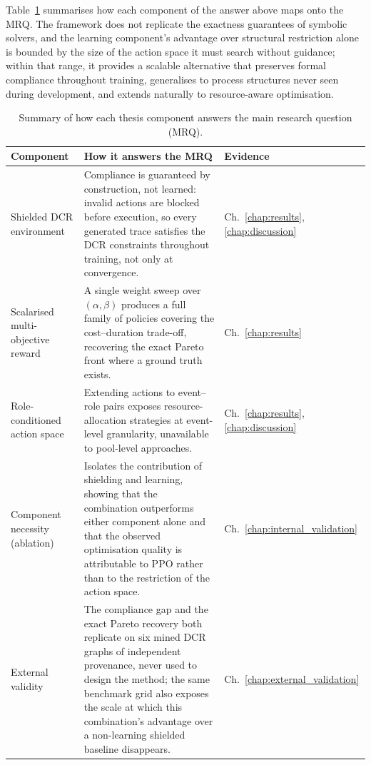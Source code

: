 Table~\ref{tab:mrq_answers} summarises how each component of the answer above maps onto the \ac{MRQ}. The framework does not replicate the exactness guarantees of symbolic solvers, and the learning component's advantage over structural restriction alone is bounded by the size of the action space it must search without guidance; within that range, it provides a scalable alternative that preserves formal compliance throughout training, generalises to process structures never seen during development, and extends naturally to resource-aware optimisation.


\begin{table}[H]
\centering
\caption{Summary of how each thesis component answers the main research question (MRQ).}
\label{tab:mrq_answers}
{\renewcommand{\arraystretch}{1.5}
\begin{tabularx}{\linewidth}{p{3.4cm} X p{2.6cm}}
\toprule
\textbf{Component} & \textbf{How it answers the MRQ} & \textbf{Evidence} \\
\midrule

Shielded \ac{DCR} environment &
Compliance is guaranteed by construction, not learned: invalid actions are blocked before execution, so every generated trace satisfies the \ac{DCR} constraints throughout training, not only at convergence. &
Ch.~\ref{chap:results}, \ref{chap:discussion} \\
\addlinespace

Scalarised multi-objective reward &
A single weight sweep over $(\alpha,\beta)$ produces a full family of policies covering the cost--duration trade-off, recovering the exact Pareto front where a ground truth exists. &
Ch.~\ref{chap:results} \\
\addlinespace

Role-conditioned action space &
Extending actions to event--role pairs exposes resource-allocation strategies at event-level granularity, unavailable to pool-level approaches. &
Ch.~\ref{chap:results}, \ref{chap:discussion} \\
\addlinespace

Component necessity (ablation) &
Isolates the contribution of shielding and learning, showing that the combination outperforms either component alone and that the observed optimisation quality is attributable to \ac{PPO} rather than to the restriction of the action space. &
Ch.~\ref{chap:internal_validation} \\
\addlinespace

External validity &
The compliance gap and the exact Pareto recovery both replicate on six mined \ac{DCR} graphs of independent provenance, never used to design the method; the same benchmark grid also exposes the scale at which this combination's advantage over a non-learning shielded baseline disappears. &
Ch.~\ref{chap:external_validation} \\

\bottomrule
\end{tabularx}}
\end{table}

